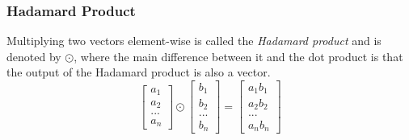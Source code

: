 \documentclass[a4paper]{article}
\theoremstyle{definition}
\begin{document}
\subsubsection{Hadamard Product}
Multiplying two vectors element-wise is called the \textit{Hadamard product} and is denoted by $\odot$, where the main difference between it and the dot product is that the output of the Hadamard product is also a vector.
\begin{equation*}
    \begin{bmatrix} a_1\\ a_2\\ ...\\ a_n \end{bmatrix} \odot \begin{bmatrix} b_1\\ b_2\\ ...\\ b_n \end{bmatrix} = \begin{bmatrix} a_1 b_1\\ a_2 b_2\\ ...\\ a_n b_n \end{bmatrix}
\end{equation*}
\vspace{10pt}
\end{document}
